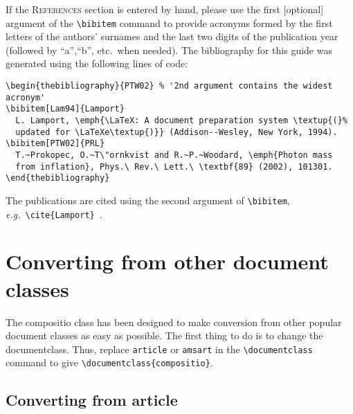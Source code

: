 \documentclass[noams]{compositio}
\newcommand*{\pkg}[1]{{\mdseries\textsf{#1}}}
\begin{document}
If the \textsc{References} section is entered by hand, please use
the first [optional] argument of the \verb+\bibitem+ command to
provide acronyms formed by the first letters of the authors'
surnames and the last two digits of the publication year (followed
by ``a'',``b'', etc.\ when needed). The bibliography for this
guide was generated using the following lines of code:
\begin{center}\begin{minipage}{5in} {\footnotesize%
\begin{verbatim}
\begin{thebibliography}{PTW02} % '2nd argument contains the widest acronym'
\bibitem[Lam94]{Lamport}
  L. Lamport, \emph{\LaTeX: A document preparation system \textup{(}%
  updated for \LaTeXe\textup{)}} (Addison--Wesley, New York, 1994).
\bibitem[PTW02]{PRL}
  T.~Prokopec, O.~T\"ornkvist and R.~P.~Woodard, \emph{Photon mass
  from inflation}, Phys.\ Rev.\ Lett.\ \textbf{89} (2002), 101301.
\end{thebibliography}
\end{verbatim}}
\end{minipage}\end{center}
The publications are cited using the second argument of
\verb+\bibitem+, \textit{e.g.}\
\verb+\cite{Lamport}+~\cite{Lamport}.

\appendix
\section{Converting from other document classes}
\label{sec:conv-from-textsf}

The \pkg{compositio} class has been designed to make conversion
from other popular document classes as easy as possible.  The
first thing to do is to change the documentclass.  Thus, replace
\texttt{article} or \texttt{amsart} in the \verb+\documentclass+
command to give \verb+\documentclass{compositio}+.

\subsection{Converting from \pkg{article}}
\label{sec:conv-from-pkgart}
\end{document}
